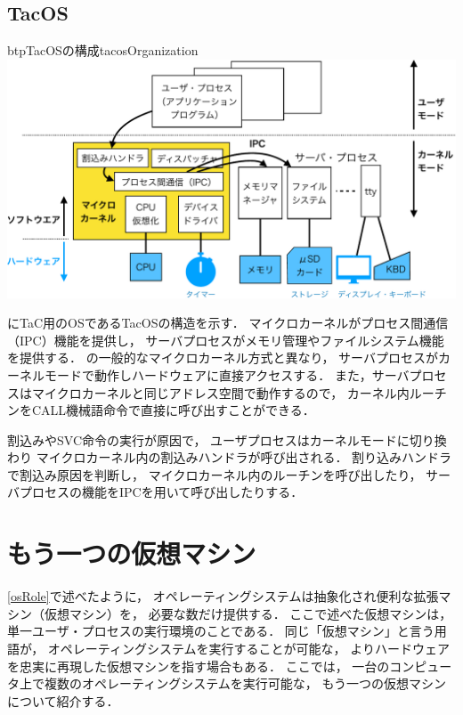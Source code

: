 \subsection{TacOS}
\begin{myfig}{btp}{TacOSの構成}{tacosOrganization}
  \includegraphics[scale=0.66]{Fig/tacosOrganization-crop.pdf}
\end{myfig}

にTaC用のOSであるTacOSの構造を示す．
マイクロカーネルがプロセス間通信（IPC）機能を提供し，
サーバプロセスがメモリ管理やファイルシステム機能を提供する．
の一般的なマイクロカーネル方式と異なり，
サーバプロセスがカーネルモードで動作しハードウェアに直接アクセスする．
また，サーバプロセスはマイクロカーネルと同じアドレス空間で動作するので，
カーネル内ルーチンをCALL機械語命令で直接に呼び出すことができる．

割込みやSVC命令の実行が原因で，
ユーザプロセスはカーネルモードに切り換わり
マイクロカーネル内の割込みハンドラが呼び出される．
割り込みハンドラで割込み原因を判断し，
マイクロカーネル内のルーチンを呼び出したり，
サーバプロセスの機能をIPCを用いて呼び出したりする．

\section{もう一つの仮想マシン}
\ref{osRole}で述べたように，
オペレーティングシステムは抽象化され便利な拡張マシン（仮想マシン）を，
必要な数だけ提供する．
ここで述べた仮想マシンは，単一ユーザ・プロセスの実行環境のことである．
同じ「仮想マシン」と言う用語が，
オペレーティングシステムを実行することが可能な，
よりハードウェアを忠実に再現した仮想マシンを指す場合もある．
ここでは，
一台のコンピュータ上で複数のオペレーティングシステムを実行可能な，
もう一つの仮想マシンについて紹介する．

